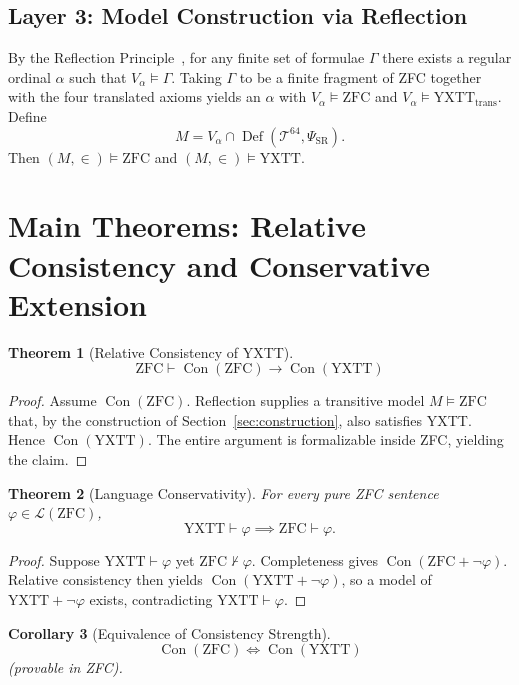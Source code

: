 \documentclass[12pt,a4paper]{article}
\newcommand{\vModels}{\vDash}
\theoremstyle{plain}
\newtheorem{theorem}{Theorem}[section]
\newtheorem{corollary}[theorem]{Corollary}
\theoremstyle{definition}
\newcommand{\Tsixtyfour}{\mathcal{T}^{64}}
\newcommand{\PSR}{\Psi_{\mathrm{SR}}}
\newcommand{\YXTT}{\mathrm{YXTT}}
\newcommand{\ZFC}{\mathrm{ZFC}}
\newcommand{\Con}{\operatorname{Con}}
\DeclareMathOperator{\Def}{Def}
\begin{document}
\subsection{Layer 3: Model Construction via Reflection}
By the Reflection Principle~\cite{kunen2011}, for any finite set of formulae $\Gamma$ there exists a regular ordinal $\alpha$ such that $V_\alpha\vDash\Gamma$. Taking $\Gamma$ to be a finite fragment of ZFC together with the four translated axioms yields an $\alpha$ with $V_\alpha\vDash\ZFC$ and $V_\alpha\vDash\YXTT_{\mathrm{trans}}$. Define
\[
M = V_\alpha \cap \Def(\Tsixtyfour,\PSR).
\]
Then $(M,\in)\vDash\ZFC$ and $(M,\in)\vModels\YXTT$.

\section{Main Theorems: Relative Consistency and Conservative Extension}
\label{sec:main_theorems}

\begin{theorem}[Relative Consistency of YXTT]\label{thm:relative_consistency}
\[
\boxed{\ZFC \vdash \Con(\ZFC) \to \Con(\YXTT)}
\]
\end{theorem}
\begin{proof}
Assume $\Con(\ZFC)$. Reflection supplies a transitive model $M\vDash\ZFC$ that, by the construction of Section~\ref{sec:construction}, also satisfies YXTT. Hence $\Con(\YXTT)$. The entire argument is formalizable inside ZFC, yielding the claim.
\end{proof}

\begin{theorem}[Language Conservativity]\label{thm:conservative}
For every pure ZFC sentence $\varphi\in\mathcal{L}(\ZFC)$,
\[
\boxed{\YXTT \vdash \varphi \implies \ZFC \vdash \varphi}.
\]
\end{theorem}
\begin{proof}
Suppose $\YXTT\vdash\varphi$ yet $\ZFC\nvdash\varphi$. Completeness gives $\Con(\ZFC+\neg\varphi)$. Relative consistency then yields $\Con(\YXTT+\neg\varphi)$, so a model of $\YXTT+\neg\varphi$ exists, contradicting $\YXTT\vdash\varphi$.
\end{proof}

\begin{corollary}[Equivalence of Consistency Strength]
\[
\boxed{\Con(\ZFC)\iff\Con(\YXTT)}
\]
(provable in ZFC).
\end{corollary}
\end{document}
